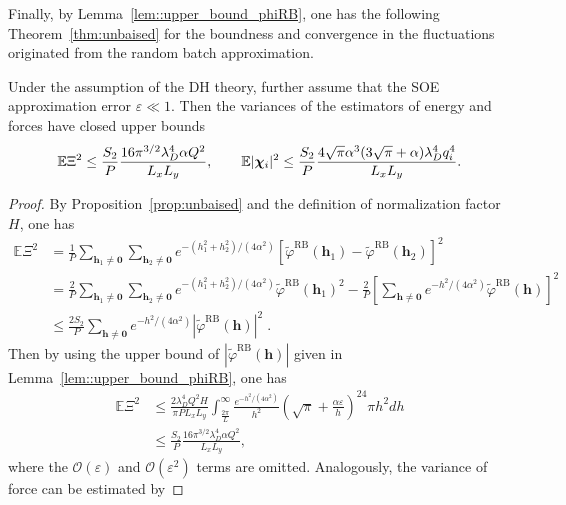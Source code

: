 Finally, by Lemma~\ref{lem::upper_bound_phiRB}, one has the following Theorem~\ref{thm:unbaised} for the boundness and convergence in the fluctuations originated from the random batch approximation.
\begin{thm}\label{thm:unbaised}
	Under the assumption of the DH theory, further assume that the SOE approximation error $\varepsilon\ll 1$. 
	Then the variances of the estimators of energy and forces have closed upper bounds
	\begin{equation}
		\mathbb{E}\Xi^2\leq \frac{S_2}{P}\frac{16\pi^{3/2}\lambda_D^4\alpha Q^2}{L_xL_y},\quad \quad \mathbb{E}|\boldsymbol{\chi}_{i}|^2\leq\frac{S_2}{P}\frac{4\sqrt{\pi}\alpha^3(3\sqrt{\pi}+\alpha)\lambda_D^4 q_{i}^4}{L_xL_y}.
	\end{equation}
\end{thm}
\begin{proof}
	By Proposition~\ref{prop:unbaised} and the definition of normalization factor $H$, one has
	\begin{equation}
		\begin{split}
			\mathbb{E}\Xi^2
			& = \frac{1}{P}\sum_{\bm{h}_1\neq \bm{0}}\sum_{\bm{h}_2\neq \bm{0}}e^{-(h_1^2+h_2^2)/(4\alpha^2)}\left[\widetilde{\varphi}^{\text{RB}}(\bm{h}_1)-\widetilde{\varphi}^{\text{RB}}(\bm{h}_2)\right]^2\\
			& = \frac{2}{P}\sum_{\bm{h}_1\neq \bm{0}}\sum_{\bm{h}_2\neq \bm{0}}e^{-(h_1^2+h_2^2)/(4\alpha^2)} \widetilde{\varphi}^{\text{RB}}(\bm{h}_1)^2 - \frac{2}{P} \left[ \sum_{\bm{h}\neq \bm{0}} e^{-h^2 /(4\alpha^2)} \widetilde{\varphi}^{\text{RB}}(\bm{h}) \right]^2\\
			& \leq \frac{2S_2}{P}\sum_{\bm{h}\neq\bm{0}}e^{-h^2/(4\alpha^2)}\left|\widetilde{\varphi}^{\text{RB}}(\bm{h})\right|^2\;.
		\end{split}
	\end{equation}
	Then by using the upper bound of $\left|\widetilde{\varphi}^{\text{RB}}(\bm{h})\right|$ given in Lemma~\ref{lem::upper_bound_phiRB}, one has 
	\begin{equation}
		\begin{split}
			\mathbb{E}\Xi^2&\leq \frac{2\lambda_D^4Q^2H}{\pi PL_xL_y}\int_{\frac{2\pi}{L}}^{\infty}\frac{e^{-h^2/(4\alpha^2)}}{h^2}\left(\sqrt{\pi}+\frac{\alpha \varepsilon}{h}\right)^24\pi h^2dh\\
			&\leq \frac{S_2}{P}\frac{16\pi^{3/2}\lambda_D^4\alpha Q^2}{L_xL_y},
		\end{split}
	\end{equation}
	where the $\mathcal{O}(\varepsilon)$ and $\mathcal{O}(\varepsilon^2)$ terms are omitted. Analogously, the variance of force can be estimated by

\end{proof}
